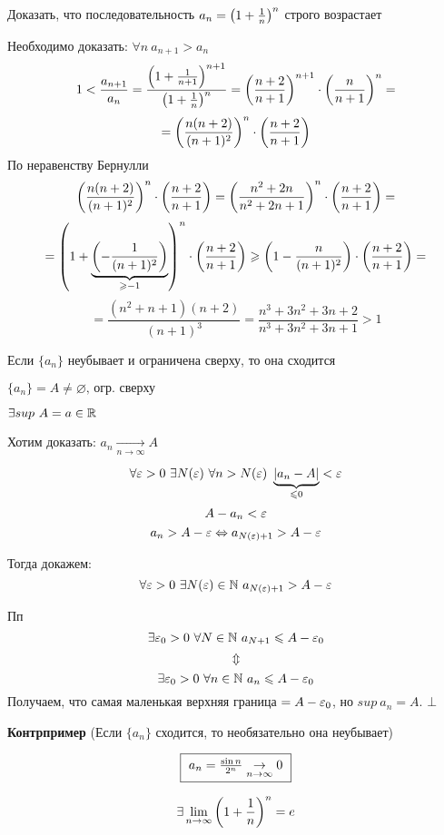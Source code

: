 \begin{example}
    Доказать, что последовательность $a_n = \left(1 + \frac{1}{n}\right)^n$ строго возрастает

    Необходимо доказать: $\forall n\ a_{n+1} > a_n$
    $$1 < \frac{a_{n+1}}{a_n} = \frac{\left(1 + \frac{1}{n+1}\right)^{n+1}}{\left(1 + \frac{1}{n}\right)^n} = \left(\frac{n+2}{n+1}\right)^{n+1} \cdot \left(\frac{n}{n+1}\right)^n =$$
    $$ = \left(\frac{n(n+2)}{(n+1)^2}\right)^n \cdot \left(\frac{n+2}{n+1}\right) $$
    По неравенству Бернулли 
    $$ \left(\frac{n(n+2)}{(n+1)^2}\right)^n \cdot \left(\frac{n+2}{n+1}\right) = \left(\frac{n^2 + 2n}{n^2 + 2n + 1}\right)^n \cdot \left(\frac{n+2}{n+1}\right) = $$
    $$ = \left(1 + \underbrace{\left(- \frac{1}{(n + 1)^2}\right)}_{\geqslant -1}\right)^n \cdot \left(\frac{n+2}{n+1}\right) \geqslant \left(1 - \frac{n}{(n + 1)^2}\right) \cdot \left(\frac{n+2}{n+1}\right) = $$
    $$ = \frac{(n^2 + n + 1)(n + 2)}{(n+1)^3} = \frac{n^3 + 3n^2 + 3n + 2}{n^3 + 3n^2 + 3n + 1} > 1 $$
\end{example}

\begin{theorem}
    Если $\{a_n\}$ неубывает и ограничена сверху, то она сходится
\end{theorem}

\begin{Proof}
    $ \{a_n\} = A \neq \varnothing \text{, огр. сверху} $

    $ \exists sup\ A = a \in \mathbb{R} $

    Хотим доказать: $a_n \underset{n \to \infty}{\to} A $

    $$ \forall \eps > 0\ \exists N(\eps)\ \forall n > N(\eps)\ \underbrace{|a_n - A|}_{\leq 0} < \eps $$
    $$ A - a_n < \varepsilon $$
    $$ a_n > A - \varepsilon \Leftrightarrow a_{N(\varepsilon) + 1} > A - \varepsilon$$

    Тогда докажем:
    $$ \forall \eps > 0\ \exists N(\eps) \in \N\ a_{N(\eps) + 1} > A - \eps $$

    Пп 
    $$ \exists \varepsilon_0 > 0\ \forall N \in \mathbb{N}\ a_{N+1} \leqslant A - \varepsilon_0 $$
    $$ \Updownarrow $$
    $$ \exists \eps_0 > 0\ \forall n \in \N\ a_{n} \leq A - \eps_0 $$
    Получаем, что самая маленькая верхняя граница $ = A - \varepsilon_0 $, но $ sup\ a_n = A$. $\bot$
\end{Proof}

\textbf{Контрпример} (Если $\{a_n\}$ сходится, то необязательно она неубывает)

$$ \fbox{
    $ a_n = \frac{\sin n}{2^n} \underset{n \rightarrow \infty}{\rightarrow} 0 $
} $$
\begin{theorem}
    $$ \exists \lim\limits_{n \to \infty} \left(1 + \frac{1}{n}\right)^n = e $$
\end{theorem}

